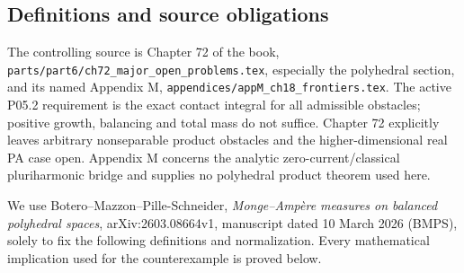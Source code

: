 \documentclass[
  10pt,
]{article}
\begin{document}
\subsection{Definitions and source
obligations}\label{definitions-and-source-obligations}

The controlling source is Chapter 72 of the book,
\texttt{parts/part6/ch72\_major\_open\_problems.tex}, especially the
polyhedral section, and its named Appendix M,
\texttt{appendices/appM\_ch18\_frontiers.tex}. The active P05.2
requirement is the exact contact integral for all admissible obstacles;
positive growth, balancing and total mass do not suffice. Chapter 72
explicitly leaves arbitrary nonseparable product obstacles and the
higher-dimensional real PA case open. Appendix M concerns the analytic
zero-current/classical pluriharmonic bridge and supplies no polyhedral
product theorem used here.

We use Botero--Mazzon--Pille-Schneider, \emph{Monge--Ampère measures on
balanced polyhedral spaces}, arXiv:2603.08664v1, manuscript dated 10
March 2026 (BMPS), solely to fix the following definitions and
normalization. Every mathematical implication used for the
counterexample is proved below.
\end{document}
